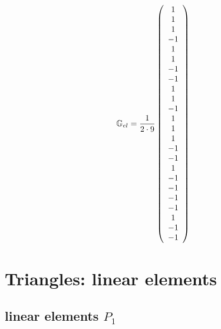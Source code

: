 \begin{scriptsize}
\[
{\mathbb{G}}_{el}=\frac{1}{2\cdot 9}
\left(
\begin{array}{c}
 1\\
 1\\
 1\\
-1\\
 1\\
 1\\
-1\\
-1\\
 1\\
 1\\
-1\\
 1\\
 1\\
 1\\
-1\\
-1\\
 1\\
-1\\
-1\\
-1\\
-1\\
 1\\
-1\\
-1
\end{array}
\right)
\]
\end{scriptsize}


\newpage
\section{Triangles: linear elements} \label{ss:tle}


\subsection{linear elements $P_1$} 

